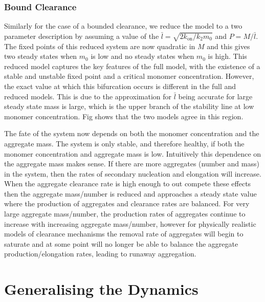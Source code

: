 \subsubsection{Bound Clearance}

Similarly for the case of a bounded clearance, we reduce the model to a two parameter description by assuming a value of the  $\bar{l} = \sqrt{2 k_\text{on}/k_2 m_0}$ and $P=M/\bar{l}$. The fixed points of this reduced system are now quadratic in $M$ and this gives two steady states when $m_0$ is low and no steady states when $m_0$ is high. This reduced model captures the key features of the full model, with the existence of a stable and unstable fixed point and a critical monomer concentration. However, the exact value at which this bifurcation occurs is different in the full and reduced models. This is due to the approximation for $\bar{l}$ being accurate for large steady state mass is large, which is the upper branch of the stability line at low monomer concentration. Fig  shows that the two models agree in this region.

The fate of the system now depends on both the monomer concentration and the aggregate mass. The system is only stable, and therefore healthy, if both the monomer concentration and aggregate mass is low. Intuitively this dependence on the aggregate mass makes sense. If there are more aggregates (number and mass) in the system, then the rates of secondary nucleation and elongation will increase. When the aggregate clearance rate is high enough to out compete these effects then the aggregate mass/number is reduced and approaches a steady state value where the production of aggregates and clearance rates are balanced. For very large aggregate mass/number, the production rates of aggregates continue to increase with increasing aggregate mass/number, however for physically realistic models of clearance mechanisms the removal rate of aggregates will begin to saturate and at some point will no longer be able to balance the aggregate production/elongation rates, leading to runaway aggregation.


\section{Generalising the Dynamics}

